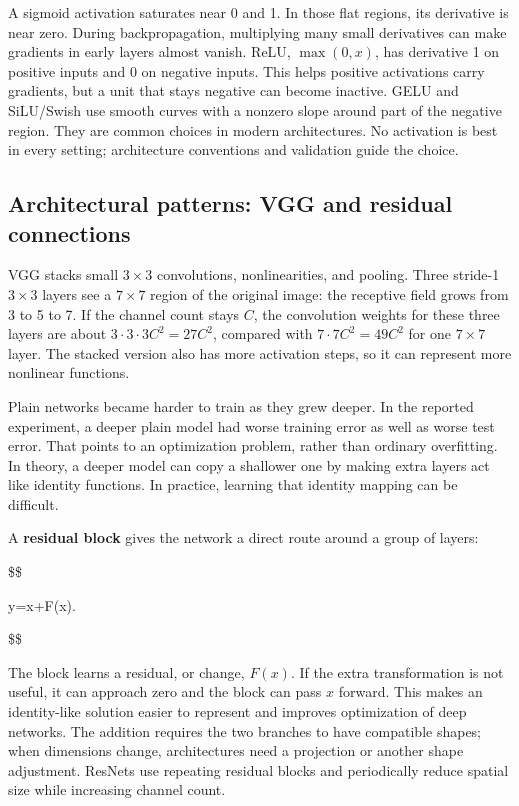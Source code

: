 A sigmoid activation saturates near 0 and 1. In those flat regions, its derivative is near zero. During backpropagation, multiplying many small derivatives can make gradients in early layers almost vanish. ReLU, \(\max(0,x)\), has derivative 1 on positive inputs and 0 on negative inputs. This helps positive activations carry gradients, but a unit that stays negative can become inactive. GELU and SiLU/Swish use smooth curves with a nonzero slope around part of the negative region. They are common choices in modern architectures. No activation is best in every setting; architecture conventions and validation guide the choice.

\subsection{Architectural patterns: VGG and residual connections}\label{04-visual-computing-ii-ch031-architectural-patterns-vgg-and-residual-connections}

VGG stacks small \(3\times3\) convolutions, nonlinearities, and pooling. Three stride-1 \(3\times3\) layers see a \(7\times7\) region of the original image: the receptive field grows from 3 to 5 to 7. If the channel count stays \(C\), the convolution weights for these three layers are about \(3\cdot3\cdot3C^2=27C^2\), compared with \(7\cdot7C^2=49C^2\) for one \(7\times7\) layer. The stacked version also has more activation steps, so it can represent more nonlinear functions.

Plain networks became harder to train as they grew deeper. In the reported experiment, a deeper plain model had worse training error as well as worse test error. That points to an optimization problem, rather than ordinary overfitting. In theory, a deeper model can copy a shallower one by making extra layers act like identity functions. In practice, learning that identity mapping can be difficult.

A \textbf{residual block} gives the network a direct route around a group of layers:

\$\$

y=x+F(x).

\$\$

The block learns a residual, or change, \(F(x)\). If the extra transformation is not useful, it can approach zero and the block can pass \(x\) forward. This makes an identity-like solution easier to represent and improves optimization of deep networks. The addition requires the two branches to have compatible shapes; when dimensions change, architectures need a projection or another shape adjustment. ResNets use repeating residual blocks and periodically reduce spatial size while increasing channel count.

